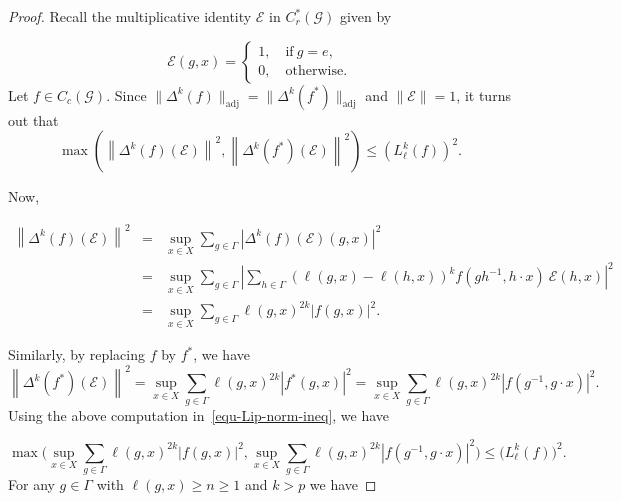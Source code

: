 \documentclass[a4paper,11pt,reqno]{amsart}
\theoremstyle{plain}
\theoremstyle{named}
\numberwithin{equation}{section}
\newcommand{\Bea}{\begin{eqnarray*}}
\newcommand{\Eea}{\end{eqnarray*}}
\begin{document}
			\begin{proof}
				Recall the multiplicative identity $\mathcal E$ in $C_r^{\ast} (\mathcal G)$ given by   
				
				$$\mathcal E (g, x) = \begin{cases} 1, \quad \text {if}\ g = e, \\ 0, \quad \text {otherwise}. \end{cases}$$ 
				Let $f \in C_c (\mathcal G)$.  Since 
			   $\|\Delta^k (f)\|_{\mathrm {adj}} = \|\Delta^k (f^{\ast})\|_{\mathrm {adj}}$ and $\|\mathcal E\| = 1$, it turns out that 
			   \begin{equation}\label{equ-Lip-norm-ineq}
			   	\max \left (\left \|\Delta^k (f) (\mathcal E) \right \|^2, \left \|\Delta^k (f^{\ast}) (\mathcal E) \right \|^2 \right ) \leq \left (L_{\ell}^k (f) \right )^2.
			   \end{equation}
			
				Now, 
				
				\Bea
				\left \|\Delta^k (f) (\mathcal E) \right \|^2 & = & \sup\limits_{x \in X} \sum\limits_{g \in \Gamma} \left \lvert \Delta^k (f) (\mathcal E) (g, x) \right \rvert^2 \\ & = & \sup\limits_{x \in X} \sum\limits_{g \in \Gamma} \left \lvert \sum\limits_{h \in \Gamma} \left (\ell (g, x) - \ell (h, x) \right )^k f \left (gh^{-1}, h \cdot x \right )\ \mathcal {E} (h, x) \right \rvert^2 \\ & = & \sup\limits_{x \in X} \sum\limits_{g \in \Gamma} \ell (g, x)^{2k} \left \lvert f(g, x) \right \rvert^2.
				\Eea
				
				Similarly, by replacing $f$ by $f^{\ast}$, we have
				\[
				\left \|\Delta^k (f^{\ast}) (\mathcal E) \right \|^2  = \sup\limits_{x \in X} \sum\limits_{g \in \Gamma} \ell (g, x)^{2k} \left \lvert f^{\ast} (g, x) \right \rvert^2  =  \sup\limits_{x \in X} \sum\limits_{g \in \Gamma} \ell (g, x)^{2k} \left \lvert f \left (g^{-1}, g \cdot x \right ) \right \rvert^2. 
				\]
	        Using the above computation in~\eqref{equ-Lip-norm-ineq}, we have
				
				$$\max \biggl (\sup\limits_{x \in X} \sum\limits_{g \in \Gamma} \ell (g, x)^{2k} \left \lvert f(g, x) \right \rvert^2, \sup\limits_{x \in X} \sum\limits_{g \in \Gamma} \ell (g, x)^{2k} \left \lvert f \left (g^{-1}, g \cdot x \right ) \right \rvert^2 \biggr ) \leq \bigl (L_{\ell}^k (f) \bigr )^2.$$
			For any $g \in \Gamma$ with $\ell (g, x) \geq n \geq 1$ and $k > p$ we have 
				

\end{proof}
\end{document}
